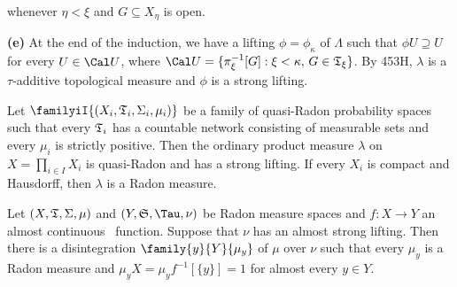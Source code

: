 { 
      
\noindent whenever $\eta<\xi$ and $G\subseteq X_{\eta}$ is open. 
      
\medskip 
      
{\bf (e)} At the end of the induction, we have a lifting 
$\phi=\phi_{\kappa}$ of $\Lambda$ such that $\phi U\supseteq U$ for 
every $U\in\Cal U$, where 
$\Cal U=\{\pi_{\xi}^{-1}[G]:\xi<\kappa,\,G\in\frak T_{\xi}\}$. 
By 453H, 
$\lambda$ is a $\tau$-additive topological measure and $\phi$ is a 
strong lifting. 
}%
      
 Let $\familyiI{(X_i,\frak T_i,\Sigma_i,\mu_i)}$ 
be a family of quasi-Radon probability spaces such that every 
$\frak T_i$ has a countable network consisting of measurable sets and 
every $\mu_i$ is strictly positive.   Then the ordinary product measure 
$\lambda$ on $X=\prod_{i\in I}X_i$ is quasi-Radon and has a strong 
lifting. 
If every $X_i$ is compact and Hausdorff, then $\lambda$ is a Radon 
measure. 
      
      
 Let $(X,\frak T,\Sigma,\mu)$ and 
$(Y,\frak S,\Tau,\nu)$ be Radon measure spaces and $f:X\to Y$ an almost 
continuous 
\imp\ function.   Suppose that $\nu$ has an almost strong lifting. 
Then there is a disintegration $\family{y}{Y}{\mu_y}$ of $\mu$ over 
$\nu$ such that every $\mu_y$ is a Radon measure and 
$\mu_yX=\mu_yf^{-1}[\{y\}]=1$ for almost every $y\in Y$. 
      
